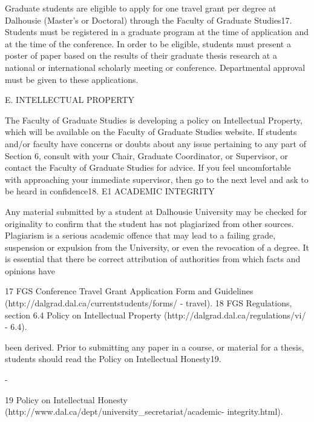 Graduate students are eligible to apply for one travel grant per degree at Dalhousie (Master’s or Doctoral) through the Faculty of Graduate Studies17. Students must be registered in a graduate program at the time of application and at the time of the conference. In order to be eligible, students must present a poster of paper based on the results of their graduate thesis research at a national or international scholarly meeting or conference. Departmental approval must be given to these applications.


E.	INTELLECTUAL  PROPERTY

The Faculty of Graduate Studies is developing a policy on Intellectual Property, which will be available on the Faculty of Graduate Studies website.
If students and/or faculty have concerns or doubts about any issue pertaining to any part of Section 6, consult with your Chair, Graduate Coordinator, or Supervisor, or contact the Faculty of Graduate Studies for advice. If you feel uncomfortable with approaching your immediate supervisor, then go to the next level and ask to be heard in confidence18.
E1	ACADEMIC INTEGRITY

Any material submitted by a student at Dalhousie University may be checked for originality to confirm that the student has not plagiarized from other sources. Plagiarism is a serious academic offence that may lead to a failing grade, suspension or expulsion from the University, or even the revocation of a degree.  It is essential that there be correct attribution of authorities from which facts and opinions have




17 FGS Conference Travel Grant Application Form and Guidelines (http://dalgrad.dal.ca/currentstudents/forms/ - travel).
18 FGS Regulations, section 6.4 Policy on Intellectual Property (http://dalgrad.dal.ca/regulations/vi/ - 6.4).
 

been derived. Prior to submitting any paper in a course, or material for a thesis, students should read the Policy on Intellectual Honesty19.





-










































19 Policy on Intellectual Honesty (http://www.dal.ca/dept/university_secretariat/academic- integrity.html).
 

